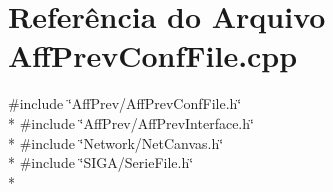 \section{Referência do Arquivo Aff\+Prev\+Conf\+File.\+cpp}
\label{_aff_prev_conf_file_8cpp}
{\ttfamily \#include \char`\"{}Aff\+Prev/\+Aff\+Prev\+Conf\+File.\+h\char`\"{}}\\*
{\ttfamily \#include \char`\"{}Aff\+Prev/\+Aff\+Prev\+Interface.\+h\char`\"{}}\\*
{\ttfamily \#include \char`\"{}Network/\+Net\+Canvas.\+h\char`\"{}}\\*
{\ttfamily \#include \char`\"{}S\+I\+G\+A/\+Serie\+File.\+h\char`\"{}}\\*

